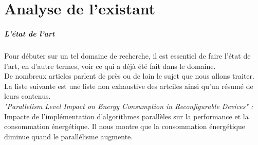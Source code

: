 \chapter{Analyse de l'existant}

\paragraph{L'état de l'art \\}
	Pour débuter sur un tel domaine de recherche, il est essentiel de faire l'état de l'art, en d'autre termes, voir ce qui a déjà été fait dans le domaine. \\

	De nombreux articles parlent de près ou de loin le sujet que nous allons traiter. \\
	La liste suivante est une liste non exhaustive des artciles ainsi qu'un résumé de leurs contenus. \\

	\textit{"Parallelism Level Impact on Energy Consumption in Reconfigurable Devices" :}\\
		Impacte de l’implémentation d'algorithmes parallèles sur la performance et la consommation énergétique. Il nous montre que la consommation énergétique diminue quand le parallélisme augmente.


